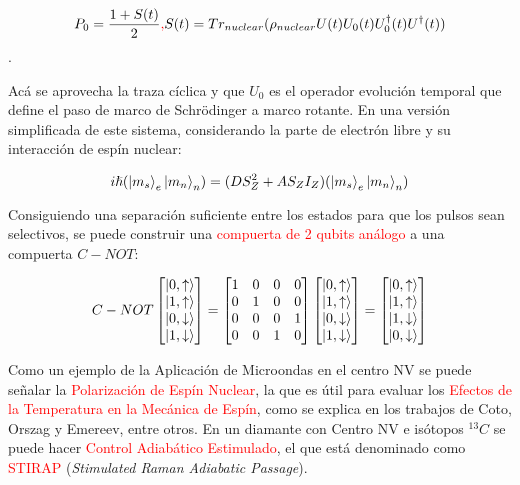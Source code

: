 \documentclass{book}
\begin{document}
\begin{equation}\label{eq8.10}P_0=\frac{1+S(t)}{2}\textcolor{red}{,} S(t)=Tr_{nuclear}(\rho_{nuclear}U(t)U_0(t)U_0^\dag(t)U^\dag(t))\end{equation}.

Acá se aprovecha la traza cíclica y que $U_0$ es el operador evolución temporal que define el paso de marco de Schr\"odinger a marco rotante. En una versión simplificada de este sistema, considerando la parte de electrón libre y su interacción de espín nuclear:

\begin{equation}\label{eq8.11}i\hslash(\ket{m_s}_e\ket{m_n}_n)=(DS_Z^2+AS_ZI_Z)(\ket{m_s}_e\ket{m_n}_n)\end{equation}

Consiguiendo una separación suficiente entre los estados para que los pulsos sean selectivos, se puede construir una \textcolor{red}{compuerta de 2 qubits análogo} a una compuerta $C-NOT$:

\begin{equation}\label{eq8.12}C-NOT\begin{bmatrix} \ket{0,\uparrow}\\\ket{1,\uparrow}\\\ket{0,\downarrow}\\\ket{1,\downarrow}\end{bmatrix}=\begin{bmatrix} 1&0&0&0\\0&1&0&0\\0&0&0&1\\0&0&1&0\end{bmatrix}\begin{bmatrix} \ket{0,\uparrow}\\\ket{1,\uparrow}\\\ket{0,\downarrow}\\\ket{1,\downarrow}\end{bmatrix}=\begin{bmatrix} \ket{0,\uparrow}\\\ket{1,\uparrow}\\\ket{1,\downarrow}\\\ket{0,\downarrow}\end{bmatrix}\end{equation}

Como un ejemplo de la Aplicación de Microondas en el centro NV se puede señalar la \textcolor{red}{Polarización de Espín Nuclear}, la que es útil para evaluar los \textcolor{red}{Efectos de la Temperatura en la Mecánica de Espín}, como se explica en los trabajos de Coto, Orszag y Emereev, entre otros. En un diamante con Centro NV e isótopos ${}^{13}C$ se puede hacer \textcolor{red}{Control Adiabático Estimulado}, el que está denominado como \textcolor{red}{STIRAP} (\textit{Stimulated Raman Adiabatic Passage}).
\end{document}
